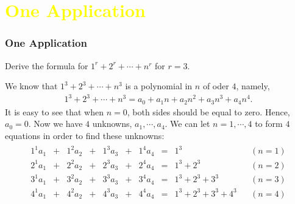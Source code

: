 \documentclass[pdf,9pt]{beamer}
\begin{document}
\section[\textcolor{yellow}{}]{\textcolor{yellow}{One Application}}
\begin{frame}[fragile]
\frametitle{One Application}
\pause
\begin{problem}
    Derive the formula for $1^r+2^r+\cdots + n^r$  for $r=3$.
\end{problem}
\pause
\vfill
\begin{solution}
    We know that $1^3 + 2^3 + \cdots + n^3$ is a polynomial in $n$ of oder $4$, namely,
    \begin{align*}
	1^3 + 2^3 + \cdots + n^3 = a_0+a_1 n + a_2 n^2 +a_3 n^3 + a_4 n^4.
    \end{align*}
    \pause
    It is easy to see that when $n=0$, both sides should be equal to zero. Hence, $a_0=0$.
    \pause
    Now we have $4$ unknowns, $a_1,\cdots, a_4$. We can let $n=1,\cdots,4$ to form $4$ equations in order to find these unknowns:
    \begin{align*}
	\begin{array}{ccccccccccc}
	    1^1a_1 & + & 1^2a_2 & + & 1^3a_3 & + & 1^4a_4 &  = & 1^3                 &  & \left(n=1\right) \\
	    2^1a_1 & + & 2^2a_2 & + & 2^3a_3 & + & 2^4a_4 &  = & 1^3+2^3             &  & \left(n=2\right) \\
	    3^1a_1 & + & 3^2a_2 & + & 3^3a_3 & + & 3^4a_4 &  = & 1^3+2^3+3^3         &  & \left(n=3\right) \\
	    4^1a_1 & + & 4^2a_2 & + & 4^3a_3 & + & 4^4a_4 &  = & 1^3+2^3+3^3+4^3     &  & \left(n=4\right) \\
	\end{array}
    \end{align*}
\end{solution}
\end{frame}
\end{document}
